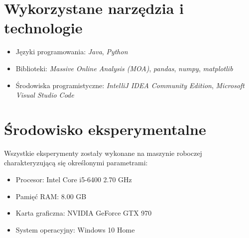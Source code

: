 \newpage

\section{Wykorzystane narzędzia i technologie}

\begin{itemize}
    \item Języki programowania: \textit{Java}, \textit{Python}
    \item Biblioteki: \textit{Massive Online Analysis (MOA)}\cite{Article:MOA}, \textit{pandas}, \textit{numpy}, \textit{matplotlib}
    \item Środowiska programistyczne: \textit{IntelliJ IDEA Community Edition}, \textit{Microsoft Visual Studio Code}
\end{itemize}

\section{Środowisko eksperymentalne}

\noindent Wszystkie eksperymenty zostały wykonane na maszynie roboczej charakteryzującą się określonymi parametrami:

\begin{itemize}
    \item Procesor: Intel Core i5-6400 2.70 GHz
    \item Pamięć RAM: 8.00 GB
    \item Karta graficzna: NVIDIA GeForce GTX 970
    \item System operacyjny: Windows 10 Home
\end{itemize}
